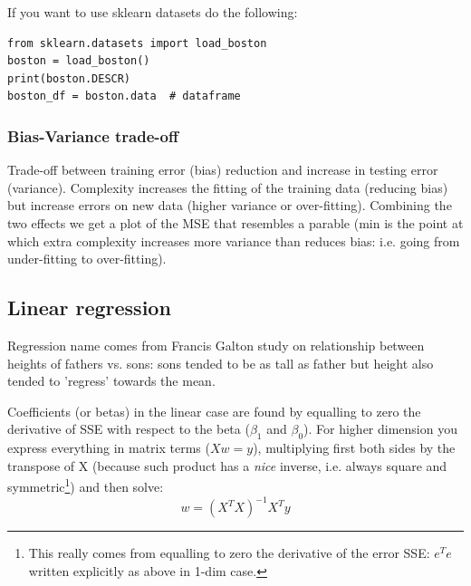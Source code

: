 \documentclass[12pt]{article}
\begin{document}
If you want to use sklearn datasets do the following:
\begin{lstlisting}
from sklearn.datasets import load_boston
boston = load_boston()
print(boston.DESCR)
boston_df = boston.data  # dataframe
\end{lstlisting} 

\subsubsection{Bias-Variance trade-off}
Trade-off between training error (bias) reduction and increase in testing error (variance).
Complexity increases the fitting of the training data (reducing bias) but increase errors on new data (higher variance or over-fitting). Combining the two effects we get a plot of the MSE that resembles a parable (min is the point at which extra complexity increases more variance than reduces bias: i.e. going from under-fitting to over-fitting).

\subsection{Linear regression}
Regression name comes from Francis Galton study on relationship between heights of fathers vs. sons: sons  tended to be as tall as father but height also tended to 'regress' towards the mean.  

Coefficients (or betas) in the linear case are found by equalling to zero the derivative of SSE with respect to the beta ($\beta_1$ and $\beta_0$). For higher dimension you express everything in matrix terms ($X w = y$), multiplying first both sides by the transpose of X (because such product has a \textit{nice} inverse, i.e. always square and symmetric\footnote{This really comes from equalling to zero the derivative of the error SSE: $e^T e$ written explicitly as above in 1-dim case.}) and then solve:
\[ w = (X^T X)^{-1} X^T y
\]
\end{document}

